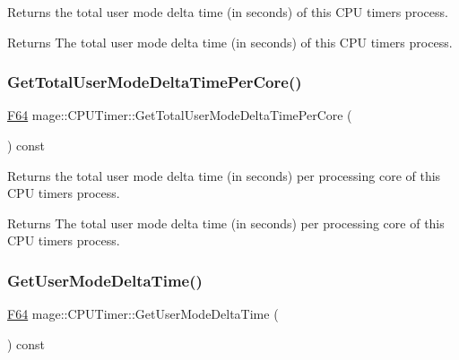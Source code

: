 Returns the total user mode delta time (in seconds) of this C\+PU timer\textquotesingle{}s process.

\begin{DoxyReturn}{Returns}
The total user mode delta time (in seconds) of this C\+PU timer\textquotesingle{}s process. 
\end{DoxyReturn}
\hypertarget{classmage_1_1_c_p_u_timer_a7eb10c5f750f03ad5e19f0b29ee4851c}{}\label{classmage_1_1_c_p_u_timer_a7eb10c5f750f03ad5e19f0b29ee4851c} 
\subsubsection{\texorpdfstring{Get\+Total\+User\+Mode\+Delta\+Time\+Per\+Core()}{GetTotalUserModeDeltaTimePerCore()}}
{\footnotesize\ttfamily \hyperlink{namespacemage_ad26233bbec640deda836e572c1a23708}{F64} mage\+::\+C\+P\+U\+Timer\+::\+Get\+Total\+User\+Mode\+Delta\+Time\+Per\+Core (\begin{DoxyParamCaption}{ }\end{DoxyParamCaption}) const\hspace{0.3cm}{\ttfamily [noexcept]}}

Returns the total user mode delta time (in seconds) per processing core of this C\+PU timer\textquotesingle{}s process.

\begin{DoxyReturn}{Returns}
The total user mode delta time (in seconds) per processing core of this C\+PU timer\textquotesingle{}s process. 
\end{DoxyReturn}
\hypertarget{classmage_1_1_c_p_u_timer_aa6873914da66a6be49ff69253f236f3e}{}\label{classmage_1_1_c_p_u_timer_aa6873914da66a6be49ff69253f236f3e} 
\subsubsection{\texorpdfstring{Get\+User\+Mode\+Delta\+Time()}{GetUserModeDeltaTime()}}
{\footnotesize\ttfamily \hyperlink{namespacemage_ad26233bbec640deda836e572c1a23708}{F64} mage\+::\+C\+P\+U\+Timer\+::\+Get\+User\+Mode\+Delta\+Time (\begin{DoxyParamCaption}{ }\end{DoxyParamCaption}) const\hspace{0.3cm}{\ttfamily [noexcept]}}

